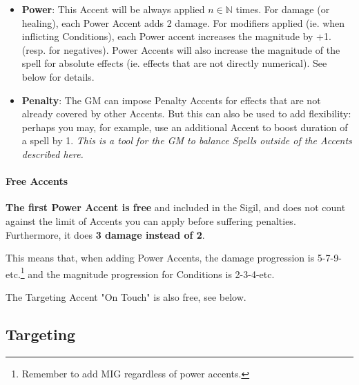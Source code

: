 \begin{itemize}
    \item \textbf{Power}: This Accent will be always applied $n \in \mathds{N}$ times. For damage (or healing), each Power Accent adds 2 damage. For modifiers applied (ie. when inflicting Conditions), each Power accent increases the magnitude by +1. (resp. for negatives). Power Accents will also increase the magnitude of the spell for absolute effects (ie. effects that are not directly numerical). See below for details.
    \item \textbf{Penalty}: The GM can impose Penalty Accents for effects that are not already covered by other Accents. But this can also be used to add flexibility: perhaps you may, for example, use an additional Accent to boost duration of a spell by 1. \textit{This is a tool for the GM to balance Spells outside of the Accents described here.}
\end{itemize}

\paragraph{Free Accents}

\textbf{The first Power Accent is free} and included in the Sigil, and does not count against the limit of Accents you can apply before suffering penalties. Furthermore, it does \textbf{3 damage instead of 2}.

This means that, when adding Power Accents, the damage progression is 5-7-9-etc.\footnote{Remember to add MIG regardless of power accents.} and the magnitude progression for Conditions is 2-3-4-etc.

The Targeting Accent "On Touch" is also free, see below.


\subsection{Targeting}

